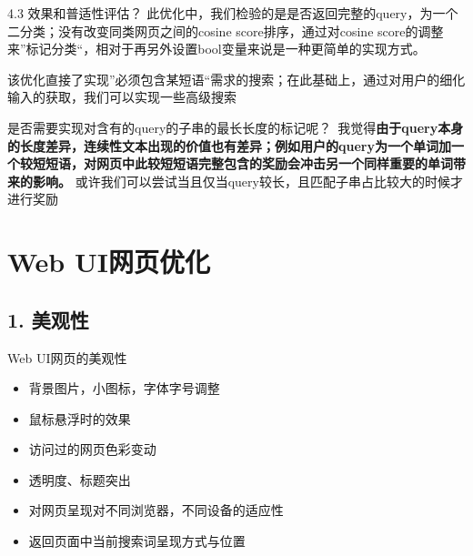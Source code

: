 \documentclass[12pt]{beamer}
\begin{document}
\begin{frame}{4.3 效果和普适性评估？}
此优化中，我们检验的是是否返回完整的query，为一个\alert{二分类}；没有改变同类网页之间的cosine score排序，通过对cosine score的调整来”标记分类“，相对于再另外设置bool变量来说是一种更简单的实现方式。

该优化直接了实现”必须包含某短语“需求的搜索；在此基础上，通过对用户的细化输入的获取，我们可以实现一些高级搜索

是否需要实现对含有的query的子串的最长长度的标记呢？ 我觉得\textbf{由于query本身的长度差异，连续性文本出现的价值也有差异；例如用户的query为一个单词加一个较短短语，对网页中此较短短语完整包含的奖励会冲击另一个同样重要的单词带来的影响。}
或许我们可以尝试当且仅当query较长，且匹配子串占比较大的时候才进行奖励
\end{frame}
\section{Web UI网页优化}

\subsection{1. 美观性} %
\begin{frame}{Web UI网页的美观性}
\begin{itemize}
\item 背景图片，小图标，字体字号调整
\item 鼠标悬浮时的效果
\item 访问过的网页色彩变动
\item 透明度、标题突出
\item 对网页呈现对不同浏览器，不同设备的适应性
\item 返回页面中当前搜索词呈现方式与位置
\end{itemize}
\end{frame}
\end{document}
